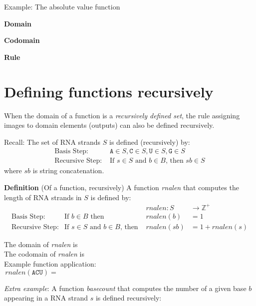 \documentclass[12pt, oneside]{article}
\newcommand{\A}[0]{\texttt{A}}
\newcommand{\C}[0]{\texttt{C}}
\newcommand{\G}[0]{\texttt{G}}
\newcommand{\U}[0]{\texttt{U}}
\begin{document}
\vfill

Example: The absolute value function 

{\bf Domain}

{\bf Codomain}

{\bf Rule}

\vfill 
 \vfill
\section*{Defining functions recursively}


When the domain of a function is a {\it recursively defined set}, the rule assigning 
images to domain elements (outputs) can also be defined recursively.

Recall: The set of RNA strands $S$ is defined (recursively) by:
\[
\begin{array}{ll}
\textrm{Basis Step: } & \A \in S, \C \in S, \U \in S, \G \in S \\
\textrm{Recursive Step: } & \textrm{If } s \in S\textrm{ and }b \in B \textrm{, then }sb \in S
\end{array}
\]
where $sb$ is string concatenation.

{\bf Definition} (Of a function, recursively) A function \textit{rnalen} that computes the length of RNA strands in $S$ is defined by:
\[
\begin{array}{llll}
& & \textit{rnalen} : S & \to \mathbb{Z}^+ \\
\textrm{Basis Step:} & \textrm{If } b \in B\textrm{ then } & \textit{rnalen}(b) & = 1 \\
\textrm{Recursive Step:} & \textrm{If } s \in S\textrm{ and }b \in B\textrm{, then  } & \textit{rnalen}(sb) & = 1 + \textit{rnalen}(s)
\end{array}
\]

The domain of \textit{rnalen} is \phantom{$S$}\\

The codomain of \textit{rnalen} is \\

Example function application:
\[
rnalen(\A\C\U) = \phantom{1+ rnalen(\A\C) = 1 + (1 + rnalen(\A) ) = 1 + ( 1 + 1) = 3}
\]

\vfill

{\it Extra example}: A function \textit{basecount} that computes the number of a given base 
$b$ appearing in a RNA strand $s$ is defined recursively:
    
\end{document}
